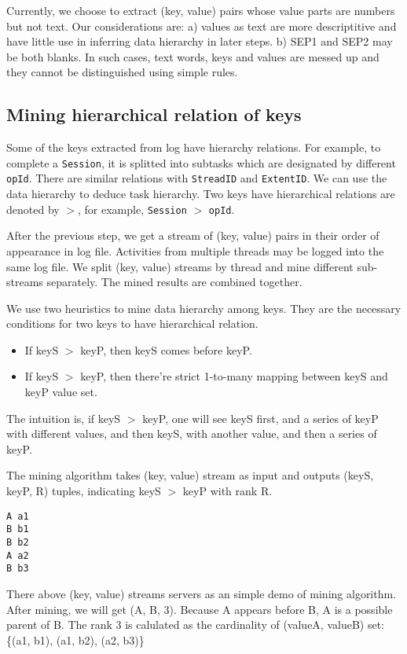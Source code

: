 Currently, we choose to extract (key, value) pairs whose
value parts are numbers but not text. Our considerations
are: a) values as text are more descriptitive and have
little use in inferring data hierarchy in later steps. b)
SEP1 and SEP2 may be both blanks. In such cases,
text words, keys and values are messed up and they cannot be
distinguished using simple rules.


\subsection{Mining hierarchical relation of keys}

Some of the keys extracted from log have hierarchy
relations. For example, to complete a \texttt{Session}, it
is splitted into subtasks which are designated by different
\texttt{opId}. There are similar relations with
\texttt{StreadID} and \texttt{ExtentID}. We can use the
data hierarchy to deduce task hierarchy. Two keys have
hierarchical relations are denoted by $>$, for example,
\texttt{Session} $>$ \texttt{opId}.

After the previous step, we get a stream of (key, value)
pairs in their order of appearance in log file. Activities
from multiple threads may be logged into the same log file.
We split (key, value) streams by thread and mine different
sub-streams separately. The mined results are combined
together.

We use two heuristics to mine data hierarchy among keys.
They are the necessary conditions for two keys to have
hierarchical relation.
\begin{itemize}
\item If keyS $>$ keyP, then keyS comes before keyP.
\item If keyS $>$ keyP, then there're strict 1-to-many
mapping between keyS and keyP value set.
\end{itemize}
The intuition is, if keyS $>$ keyP, one will see keyS first,
and a series of keyP with different values, and then keyS,
with another value, and then a series of keyP. 

The mining algorithm takes (key, value) stream as input and
outputs (keyS, keyP, R) tuples, indicating keyS $>$ keyP
with rank R.

\begin{verbatim}
A a1
B b1
B b2
A a2
B b3
\end{verbatim}

There above (key, value) streams servers as an simple demo
of mining algorithm. After mining, we will get (A, B, 3).
Because A appears before B, A is a possible parent of B. The
rank 3 is calulated as the cardinality of (valueA, valueB)
set: \{(a1, b1), (a1, b2), (a2, b3)\}

